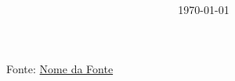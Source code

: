 \documentclass[10pt]{book}
\title{
	\vspace*{-5mm}
	\resizebox{60mm}{12mm}{\textcolor{black}{ABC}}
	\\
	\resizebox{60mm}{6mm}{\textcolor{black}{\textbf{da Inform\'{a}tica}}}
	\\
	\resizebox{80mm}{5mm}{\textcolor{black}{Aulas Expositivas}}
}
\author{
	\resizebox{60mm}{4mm}{\textcolor{black} Alexandre Aravecchia}
}
\date{\small \today}
\begin{document}
	
	\maketitle
	
	\begin{multicols}{2}
		\tableofcontents
	\end{multicols}
	
	{\normalsize Fonte: \href{URL_DA_FONTE}{Nome da Fonte}}
	
	
	
\end{document}
